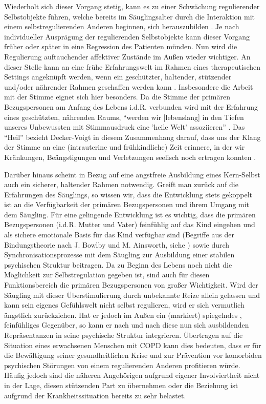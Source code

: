 Wiederholt sich dieser Vorgang stetig, kann es zu einer Schwächung regulierender Selbstobjekte führen, welche bereits im Säuglingsalter durch die Interaktion mit einem selbstregulierenden Anderen beginnen, sich herauszubilden \autocite[vgl.][338f.]{stern2007}. Je nach individueller Ausprägung der regulierenden Selbstobjekte kann dieser Vorgang früher oder später in eine Regression des Patienten münden. Nun wird die Regulierung auftauchender affektiver Zustände im Außen wieder wichtiger. 
An dieser Stelle kann an eine frühe Erfahrungswelt im Rahmen eines therapeutischen Settings angeknüpft werden, wenn ein geschützter, haltender, stützender und/oder nährender Rahmen geschaffen werden kann \autocite[vgl.][58ff.]{timmermann2008}. Insbesondere die Arbeit mit der Stimme eignet sich hier besonders. Da die Stimme der primären Bezugspersonen am Anfang des Lebens i.d.R. verbunden wird mit der Erfahrung eines geschützten, nährenden Raums, "`werden wir [lebenslang] in den Tiefen unseres Unbewussten mit Stimmausdruck eine 'heile Welt' assoziieren"' \autocite[282]{deckervoigt2000}. Das "`Heil"' bezieht Decker-Voigt in diesem Zusammenhang darauf, dass uns der Klang der Stimme an eine (intrauterine und frühkindliche) Zeit erinnere, in der wir Kränkungen, Beängstigungen und Verletzungen seelisch noch ertragen konnten \autocite[vgl.][282]{deckervoigt2000}. 

Darüber hinaus scheint in Bezug auf eine angstfreie Ausbildung eines Kern-Selbst auch ein sicherer, haltender Rahmen notwendig. Greift man zurück auf die Erfahrungen des Säuglings, so wissen wir, dass die Entwicklung stets gekoppelt ist an die Verfügbarkeit der primären Bezugspersonen und ihrem Umgang mit dem Säugling. Für eine gelingende Entwicklung ist es wichtig, dass die primären Bezugspersonen (i.d.R. Mutter und Vater) feinfühlig auf das Kind eingehen und als sichere emotionale Basis für das Kind verfügbar sind (Begriffe aus der Bindungstheorie nach J. Bowlby und M. Ainsworth, siehe \cite{brisch2013}) sowie durch Synchronisationsprozesse mit dem Säugling zur Ausbildung einer stabilen psychischen Struktur beitragen. Da zu Beginn des Lebens noch nicht die Möglichkeit zur Selbstregulation gegeben ist, sind auch für diesen Funktionsbereich die primären Bezugspersonen von großer Wichtigkeit. Wird der Säugling mit dieser Überstimulierung durch unbekannte Reize allein gelassen und kann sein eigenes Gefühlswelt nicht selbst regulieren, wird er sich vermutlich ängstlich zurückziehen. Hat er jedoch im Außen ein (markiert) spiegelndes \autocite[vgl.][153]{fonagy2004}, feinfühliges Gegenüber, so kann er nach und nach diese nun sich ausbildenden Repräsentanzen in seine psychische Struktur integrieren. 
Übertragen auf die Situation eines erwachsenen Menschen mit COPD kann dies bedeuten, dass er für die Bewältigung seiner gesundheitlichen Krise und zur Prävention vor komorbiden psychischen Störungen von einem regulierenden Anderen profitieren würde. Häufig jedoch sind die näheren Angehörigen aufgrund eigener Involviertheit nicht in der Lage, diesen stützenden Part zu übernehmen oder die Beziehung ist aufgrund der Krankheitssituation bereits zu sehr belastet. 

